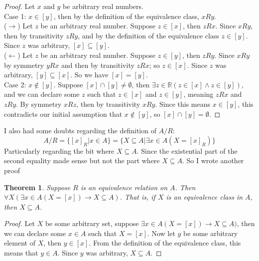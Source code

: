 \documentclass{report}
\newtheorem*{theorem}{Theorem}
\theoremstyle{definition}
\begin{document}
\begin{proof}
Let $x$ and $y$ be arbitrary real numbers.\\
\indent Case 1: $x\in[y]$, then by the definition of the equivalence class, $xRy$.\\
\indent($\rightarrow$) Let $z$ be an arbitrary real number. Suppose $z\in[x]$, then $zRx$. Since $xRy$, then by transitivity $zRy$, and by the definition of the equivalence class $z\in[y]$.
Since $z$ was arbitrary, $[x]\subseteq[y]$.\\
\indent($\leftarrow$) Let $z$ be an arbitrary real number. Suppose $z\in[y]$, then $zRy$. Since $xRy$ by symmetry $yRx$ and then by transitivity $zRx$; so $z\in[x]$. Since $z$ was arbitrary,
$[y]\subseteq[x]$. So we have $[x]=[y]$.\\
\indent Case 2: $x\notin[y]$. Suppose $[x]\cap[y]\neq\emptyset$, then $\exists z\in\mathbb R(z\in[x]\land z\in[y])$, and we can declare some $z$ such that $z\in[x]$ and $z\in[y]$, meaning $zRx$ and 
$zRy$. By symmetry $xRz$, then by transitivity $xRy$. Since this means $x\in[y]$, this contradicts our initial assumption that $x\notin[y]$, so $[x]\cap[y]=\emptyset$.
\end{proof}
\noindent I also had some doubts regarding the definition of $A/R$:
\begin{equation*}
A/R=\{[x]_R|x\in A\}=\{X\subseteq A|\exists x\in A(X=[x]_R)\}
\end{equation*}
Particularly regarding the bit where $X\subseteq A$. Since the existential part of the second equality made sense but not the part where $X\subseteq A$. So I wrote another proof
\begin{theorem}
Suppose $R$ is an equivalence relation on $A$. Then $\forall X(\exists x\in A(X=[x])\to X\subseteq A)$. That is, if $X$ is an equivalence class in $A$, then $X\subseteq A$.
\end{theorem}
\begin{proof}
Let $X$ be some arbitrary set, suppose $\exists x\in A(X=[x])\to X\subseteq A)$, then we can declare some $x\in A$ such that $X=[x]$. Now let $y$ be some arbitrary element of $X$, then $y\in[x]$.
From the definition of the equivalence class, this means that $y\in A$. Since $y$ was arbitrary, 
$X\subseteq A$.
\end{proof}
\newpage
\end{document}
